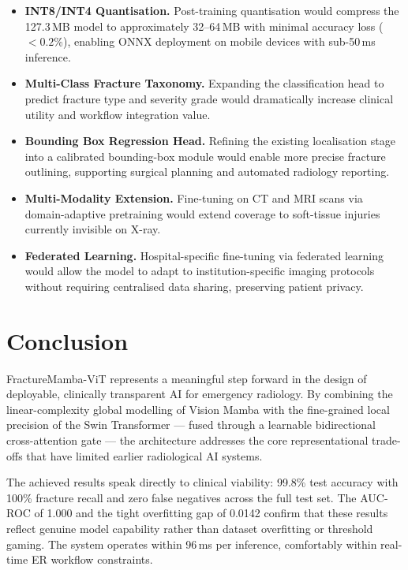 \documentclass[12pt, a4paper]{article}
\begin{document}
\begin{itemize}

  \item \textbf{INT8/INT4 Quantisation.}
  Post-training quantisation would compress the 127.3\,MB model to approximately 32--64\,MB
  with minimal accuracy loss ($<0.2$\%), enabling ONNX deployment on mobile devices with
  sub-50\,ms inference.

  \item \textbf{Multi-Class Fracture Taxonomy.}
  Expanding the classification head to predict fracture type and severity grade would
  dramatically increase clinical utility and workflow integration value.

  \item \textbf{Bounding Box Regression Head.}
  Refining the existing localisation stage into a calibrated bounding-box module would enable
  more precise fracture outlining, supporting surgical planning and automated radiology reporting.

  \item \textbf{Multi-Modality Extension.}
  Fine-tuning on CT and MRI scans via domain-adaptive pretraining would extend coverage to
  soft-tissue injuries currently invisible on X-ray.

  \item \textbf{Federated Learning.}
  Hospital-specific fine-tuning via federated learning would allow the model to adapt to
  institution-specific imaging protocols without requiring centralised data sharing,
  preserving patient privacy.

\end{itemize}

\section{Conclusion}

FractureMamba-ViT represents a meaningful step forward in the design of deployable, clinically
transparent AI for emergency radiology. By combining the linear-complexity global modelling of
Vision Mamba with the fine-grained local precision of the Swin Transformer — fused through a
learnable bidirectional cross-attention gate — the architecture addresses the core
representational trade-offs that have limited earlier radiological AI systems.

The achieved results speak directly to clinical viability: 99.8\% test accuracy with 100\%
fracture recall and zero false negatives across the full test set. The AUC-ROC of 1.000 and the
tight overfitting gap of 0.0142 confirm that these results reflect genuine model capability
rather than dataset overfitting or threshold gaming. The system operates within 96\,ms per
inference, comfortably within real-time ER workflow constraints.
\end{document}
